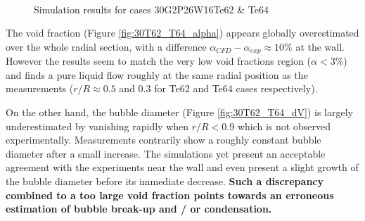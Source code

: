 \begin{figure}[!h]
\centering
{}
\\
\caption{Simulation results for cases 30G2P26W16Te62 \& Te64}
\label{fig:deb_cfd_30T62_T64}
\end{figure}


\npar

The void fraction (Figure \ref{fig:30T62_T64_alpha}) appears globally overestimated over the whole radial section, with a difference $\alpha_{CFD} - \alpha_{exp} \approx 10\%$ at the wall. However the results seem to match the very low void fractions region ($\alpha < 3\%$) and finds a pure liquid flow roughly at the same radial position as the measurements ($r/R \approx 0.5$ and $0.3$ for Te62 and Te64 cases respectively).

\npar

On the other hand, the bubble diameter (Figure \ref{fig:30T62_T64_dV}) is largely underestimated by vanishing rapidly when $r/R < 0.9$ which is not observed experimentally. Measurements contrarily show a roughly constant bubble diameter after a small increase. The simulations yet present an acceptable agreement with the experiments near the wall and even present a slight growth of the bubble diameter before its immediate decrease. \textbf{Such a discrepancy combined to a too large void fraction points towards an erroneous estimation of bubble break-up and / or condensation.}

